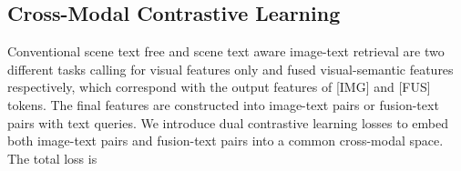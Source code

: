 \documentclass[10pt,twocolumn,letterpaper]{article}
\begin{document}
\begin{table*}[thb]
\centering
\begin{threeparttable}
\caption{Comparisons with the state-of-the-art scene text aware approaches on CTC.}\vspace{-0.5em}
\label{Tab-scene-IRTR}

\footnotesize
{}
\end{threeparttable}
\end{table*}

\subsection{Cross-Modal Contrastive Learning}
\label{Cross-Modal Contrastive Learning}

Conventional scene text free and scene text aware image-text retrieval are two different tasks calling for visual features only and fused visual-semantic features respectively, which correspond with the output features of [IMG] and [FUS] tokens. The final features are constructed into image-text pairs or fusion-text pairs with text queries. 
We introduce dual contrastive learning losses to embed both image-text pairs and fusion-text pairs into a common cross-modal space.
The total loss is
\end{document}
